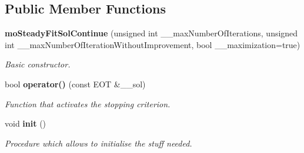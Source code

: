 \subsection*{Public Member Functions}
\begin{CompactItemize}
\item 
{\bf moSteadyFitSolContinue} (unsigned int \_\-\_\-maxNumberOfIterations, unsigned int \_\-\_\-maxNumberOfIterationWithoutImprovement, bool \_\-\_\-maximization=true)
\begin{CompactList}\small\item\em Basic constructor. \item\end{CompactList}\item 
bool {\bf operator()} (const EOT \&\_\-\_\-sol)
\begin{CompactList}\small\item\em Function that activates the stopping criterion. \item\end{CompactList}\item 
void {\bf init} ()\label{classmo_steady_fit_sol_continue_87563493addc8e4b58982c55a67179b9}

\begin{CompactList}\small\item\em Procedure which allows to initialise the stuff needed. \item\end{CompactList}\end{CompactItemize}
